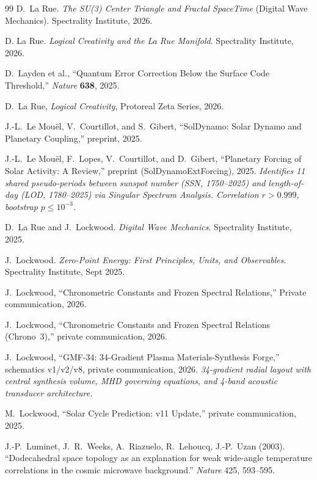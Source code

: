 \documentclass[12pt,oneside]{book}
\begin{document}
\begin{thebibliography}{99}
D.~La Rue.
\textit{The SU(3) Center Triangle and Fractal SpaceTime} (Digital Wave Mechanics).
Spectrality Institute, 2026.

D. La Rue.
\textit{Logical Creativity and the La Rue Manifold}.
Spectrality Institute, 2026.

D.~Layden et al., ``Quantum Error Correction Below the Surface Code Threshold,'' \emph{Nature} \textbf{638}, 2025.

D.~La Rue, \emph{Logical Creativity}, Protoreal Zeta Series, 2026.

J.-L.~Le Mou\"{e}l, V.~Courtillot, and S.~Gibert, ``SolDynamo: Solar Dynamo and Planetary Coupling,'' preprint, 2025.

J.-L.~Le Mou\"{e}l, F.~Lopes, V.~Courtillot, and D.~Gibert,
``Planetary Forcing of Solar Activity: A Review,''
preprint (SolDynamoExtForcing), 2025.
\textit{Identifies 11 shared pseudo-periods between sunspot number (SSN, 1750--2025)
and length-of-day (LOD, 1780--2025) via Singular Spectrum Analysis.
Correlation $r > 0.999$, bootstrap $p \leq 10^{-3}$.}

D.~La Rue and J.~Lockwood.
\textit{Digital Wave Mechanics}.
Spectrality Institute, 2025.

J.~Lockwood.
\textit{Zero-Point Energy: First Principles, Units, and Observables}.
Spectrality Institute, Sept 2025.

J.~Lockwood,
``Chronometric Constants and Frozen Spectral Relations,''
Private communication, 2026.

J.~Lockwood, ``Chronometric Constants and Frozen Spectral Relations (Chrono~3),'' private communication, 2026.

J.~Lockwood,
``GMF-34: 34-Gradient Plasma Materials-Synthesis Forge,''
schematics v1/v2/v8, private communication, 2026.
\textit{34-gradient radial layout with central synthesis volume, MHD governing equations, and 4-band acoustic transducer architecture.}

M.~Lockwood, ``Solar Cycle Prediction: v11 Update,'' private communication, 2025.

J.-P.~Luminet, J.~R.~Weeks, A.~Riazuelo, R.~Lehoucq, J.-P.~Uzan (2003).
``Dodecahedral space topology as an explanation for weak wide-angle temperature correlations in the cosmic microwave background.''
\textit{Nature} 425, 593--595.


\end{thebibliography}
\end{document}
